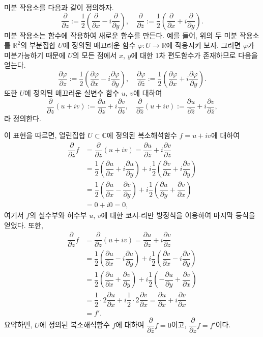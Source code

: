 미분 작용소를 다음과 같이 정의하자.
\[
\dfrac\partial {\partial z} := 
\dfrac 12 \left( \dfrac\partial {\partial x} - i \dfrac\partial {\partial y} \right),
\quad
\dfrac\partial {\partial \bar z} :=
\dfrac 12 \left( \dfrac\partial {\partial x} + i \dfrac\partial {\partial y} \right).
\]
미분 작용소는 함수에 작용하여 새로운 함수를 만든다.
예를 들어, 위의 두 미분 작용소를 
$\mathbb R^2$의 부분집합 $U$에 정의된 매끄러운 함수 $\varphi: U\to \mathbb R$에
작용시키 보자.
그러면 $\varphi$가 미분가능하기 때문에
$U$의 모든 점에서 $x$, $y$에 대한 1차 편도함수가 존재하므로 다음을 얻는다.
\[
\dfrac{\partial \varphi}{\partial z} := 
\dfrac 12 \left( \dfrac{\partial \varphi}{\partial x} 
- i \dfrac{\partial \varphi}{\partial y} \right),
\quad
\dfrac{\partial \varphi}{\partial \bar z} :=
\dfrac 12 \left( \dfrac{\partial \varphi}{\partial x} 
+ i \dfrac{\partial \varphi}{\partial y} \right).
\]
또한 $U$에 정의된 매끄러운 실변수 함수 $u$, $v$에 대하여
\[
\dfrac\partial {\partial z}(u+iv)
:= \dfrac{\partial u}{\partial z} + i\dfrac{\partial v}{\partial z},
\quad
\dfrac\partial {\partial \bar z}(u+iv)
:= \dfrac{\partial u}{\partial \bar z} + i\dfrac{\partial v}{\partial \bar z},
\]
라 정의한다.

이 표현을 따르면, 
열린집합 $U\subset \mathbb C$에 정의된 복소해석함수 $f=u+iv$에 대하여
\begin{align*}
\dfrac{\partial}{\partial \bar z} f
&= \dfrac{\partial}{\partial \bar z} (u+iv) 
= \dfrac{\partial u}{\partial \bar z} + i\dfrac{\partial v}{\partial \bar z} \\
&= \dfrac 12 \left( \dfrac{\partial u}{\partial x} 
+ i \dfrac{\partial u}{\partial y} \right)
+ i\dfrac 12 \left( \dfrac{\partial v}{\partial x} 
+ i \dfrac{\partial v}{\partial y} \right) \\
&= \dfrac 12 \left( \dfrac{\partial u}{\partial x} 
- \dfrac{\partial v}{\partial y} \right)
+ i\dfrac 12 \left( \dfrac{\partial u}{\partial y} 
+ \dfrac{\partial v}{\partial x} \right) \\
&= 0 + i0 = 0,
\end{align*}
여기서 $f$의 실수부와 허수부 $u$, $v$에 대한 코시-리만 방정식을 이용하여
마지막 등식을 얻었다.
또한, 
\begin{align*}
\dfrac{\partial}{\partial z} f
&= \dfrac{\partial}{\partial z} (u+iv) 
= \dfrac{\partial u}{\partial  z} + i\dfrac{\partial v}{\partial z} \\
&= \dfrac 12 \left( \dfrac{\partial u}{\partial x} 
- i \dfrac{\partial u}{\partial y} \right)
+ i\dfrac 12 \left( \dfrac{\partial v}{\partial x} 
- i \dfrac{\partial v}{\partial y} \right) \\
&= \dfrac 12 \left( \dfrac{\partial u}{\partial x} 
+ \dfrac{\partial v}{\partial y} \right)
+ i\dfrac 12 \left( - \dfrac{\partial u}{\partial y} 
+ \dfrac{\partial v}{\partial x} \right) \\
&= \dfrac12 \cdot 2 \dfrac{\partial u}{\partial x} 
+ i\dfrac12 \cdot 2 \dfrac{\partial v}{\partial x} 
= \dfrac{\partial u}{\partial x}  + i \dfrac{\partial v}{\partial x}  \\
&= f'.
\end{align*}
요약하면, $U$에 정의된 복소해석함수 $f$에 대하여
$\dfrac{\partial}{\partial \bar z} f =0$이고,
$\dfrac{\partial}{\partial z} f =f'$이다.

